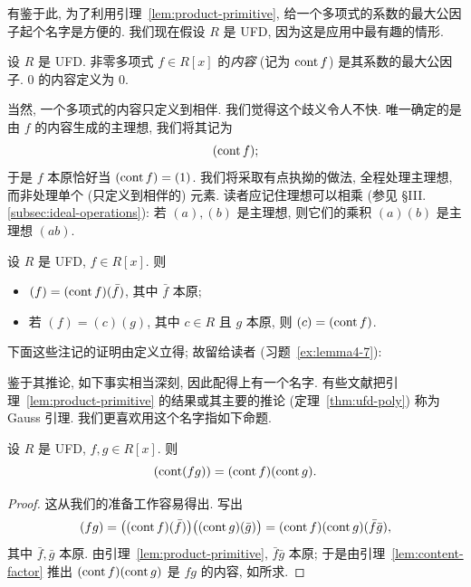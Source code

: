 \noindent 有鉴于此, 为了利用引理~\ref{lem:product-primitive}, 给一个多项式的系数的最大公因子起个名字是方便的. 我们现在假设 $R$ 是 UFD, 因为这是应用中最有趣的情形.

\begin{definition}\label{def:content}
设 $R$ 是 UFD. 非零多项式 $f\in R[x]$ 的\emph{内容} (记为 $\operatorname{cont} f$) 是其系数的最大公因子. $0$ 的内容定义为 $0$.
\end{definition}

\noindent 当然, 一个多项式的内容只定义到相伴. 我们觉得这个歧义令人不快. 唯一确定的是由 $f$ 的内容生成的主理想, 我们将其记为
\[
(\operatorname{cont} f);
\]
于是 $f$ 本原恰好当 $(\operatorname{cont} f)=(1)$. 我们将采取有点执拗的做法, 全程处理主理想, 而非处理单个 (只定义到相伴的) 元素. 读者应记住理想可以相乘 (参见 §III.\ref{subsec:ideal-operations}): 若 $(a),(b)$ 是主理想, 则它们的乘积 $(a)(b)$ 是主理想 $(ab)$.

\begin{lemma}\label{lem:content-factor}
设 $R$ 是 UFD, $f\in R[x]$. 则
\begin{itemize}
\item $(f)=(\operatorname{cont} f)(\bar f)$, 其中 $\bar f$ 本原;
\item 若 $(f)=(c)(g)$, 其中 $c\in R$ 且 $g$ 本原, 则 $(c)=(\operatorname{cont} f)$.
\end{itemize}
\end{lemma}

\noindent 下面这些注记的证明由定义立得; 故留给读者 (习题~\ref{ex:lemma4-7}):

\noindent 鉴于其推论, 如下事实相当深刻, 因此配得上有一个名字. 有些文献把引理~\ref{lem:product-primitive} 的结果或其主要的推论 (定理~\ref{thm:ufd-poly}) 称为 Gauss 引理. 我们更喜欢用这个名字指如下命题.

\begin{proposition}[Gauss 引理]\label{prop:gauss-lemma}
设 $R$ 是 UFD, $f,g\in R[x]$. 则
\[
(\operatorname{cont}(fg)) = (\operatorname{cont} f)(\operatorname{cont} g).
\]
\end{proposition}

\begin{proof}
这从我们的准备工作容易得出. 写出
\[
(fg) = \bigl((\operatorname{cont} f)(\bar f)\bigr)\bigl((\operatorname{cont} g)(\bar g)\bigr) = (\operatorname{cont} f)(\operatorname{cont} g)(\bar f\bar g),
\]
其中 $\bar f,\bar g$ 本原. 由引理~\ref{lem:product-primitive}, $\bar f\bar g$ 本原; 于是由引理~\ref{lem:content-factor} 推出 $(\operatorname{cont} f)(\operatorname{cont} g)$ 是 $fg$ 的内容, 如所求.
\end{proof}

